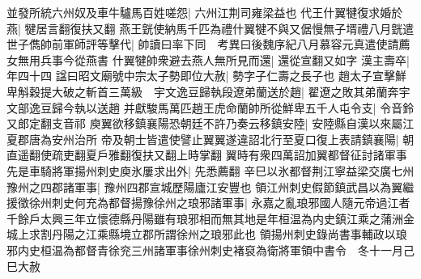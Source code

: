 並發所統六州奴及車牛驢馬百姓嗟怨|{
	六州江荆司雍梁益也}
代王什翼犍復求婚於燕|{
	犍居言翻復扶又翻}
燕王皝使納馬千匹為禮什翼犍不與又倨慢無子壻禮八月皝遣世子儁帥前軍師評等擊代|{
	帥讀曰率下同　考異曰後魏序紀八月慕容元真遣使請薦女無用兵事今從燕書}
什翼犍帥衆避去燕人無所見而還|{
	還從宣翻又如字}
漢主壽卒|{
	年四十四}
諡曰昭文廟號中宗太子勢即位大赦|{
	勢字子仁壽之長子也}
趙太子宣擊鮮卑斛穀提大破之斬首三萬級　宇文逸豆歸執段遼弟蘭送於趙|{
	翟遼之敗其弟蘭奔宇文部逸豆歸今執以送趙}
并獻駿馬萬匹趙王虎命蘭帥所從鮮卑五千人屯令支|{
	令音鈴又郎定翻支音祁}
庾翼欲移鎮襄陽恐朝廷不許乃奏云移鎮安陸|{
	安陸縣自漢以來屬江夏郡唐為安州治所}
帝及朝士皆遣使譬止翼翼遂違詔北行至夏口復上表請鎮襄陽|{
	朝直遥翻使疏吏翻夏戶雅翻復扶又翻上時掌翻}
翼時有衆四萬詔加翼都督征討諸軍事先是車騎將軍揚州刺史庾氷屢求出外|{
	先悉薦翻}
辛巳以氷都督荆江寧益梁交廣七州豫州之四郡諸軍事|{
	豫州四郡宣城歷陽廬江安豐也}
領江州刺史假節鎮武昌以為翼繼援徵徐州刺史何充為都督揚豫徐州之琅邪諸軍事|{
	永嘉之亂琅邪國人隨元帝過江者千餘戶太興三年立懷德縣丹陽雖有琅邪相而無其地是年桓温為内史鎮江乘之蒲洲金城上求割丹陽之江乘縣境立郡所謂徐州之琅邪此也}
領揚州刺史錄尚書事輔政以琅邪内史桓温為都督青徐兖三州諸軍事徐州刺史褚裒為衛將軍領中書令　冬十一月己巳大赦

